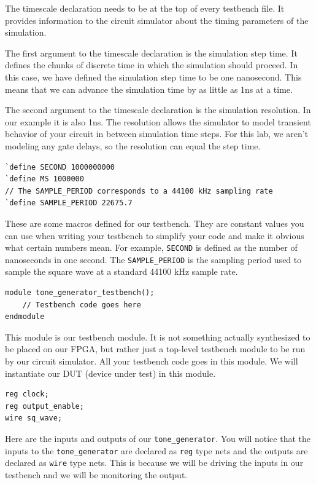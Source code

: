 \documentclass[11pt]{article}
\begin{document}
The timescale declaration needs to be at the top of every testbench file. It provides information to the circuit simulator about the timing parameters of the simulation.

The first argument to the timescale declaration is the simulation step time. It defines the chunks of discrete time in which the simulation should proceed. In this case, we have defined the simulation step time to be one nanosecond. This means that we can advance the simulation time by as little as 1ns at a time.

The second argument to the timescale declaration is the simulation resolution. In our example it is also 1ns. The resolution allows the simulator to model transient behavior of your circuit in between simulation time steps. For this lab, we aren't modeling any gate delays, so the resolution can equal the step time.

\begin{verbatim}
`define SECOND 1000000000
`define MS 1000000
// The SAMPLE_PERIOD corresponds to a 44100 kHz sampling rate
`define SAMPLE_PERIOD 22675.7
\end{verbatim}

These are some macros defined for our testbench. They are constant values you can use when writing your testbench to simplify your code and make it obvious what certain numbers mean. For example, \verb|SECOND| is defined as the number of nanoseconds in one second. The \verb|SAMPLE_PERIOD| is the sampling period used to sample the square wave at a standard 44100 kHz sample rate.

\begin{verbatim}
module tone_generator_testbench();
	// Testbench code goes here
endmodule
\end{verbatim}

This module is our testbench module. It is not something actually synthesized to be placed on our FPGA, but rather just a top-level testbench module to be run by our circuit simulator. All your testbench code goes in this module. We will instantiate our DUT (device under test) in this module.

\begin{verbatim}
reg clock;
reg output_enable;
wire sq_wave;
\end{verbatim}

Here are the inputs and outputs of our \verb|tone_generator|. You will notice that the inputs to the \verb|tone_generator| are declared as \verb|reg| type nets and the outputs are declared as \verb|wire| type nets. This is because we will be driving the inputs in our testbench and we will be monitoring the output.
\end{document}
